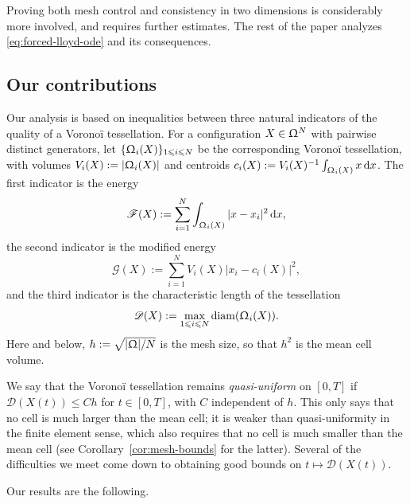 \documentclass[letterpaper,11pt,twoside]{article}
\numberwithin{figure}{section}
\numberwithin{table}{section}
\theoremstyle{cpamplain}
\theoremstyle{cpamdefinition}
\newcommand{\diff}{\mathrm{d}}
\let\Omega\Upomega
\renewcommand{\leq}{\leqslant}
\renewcommand{\le}{\leqslant}
\numberwithin{equation}{section}
\begin{document}
Proving both mesh control and consistency in two dimensions is considerably more involved, and requires further estimates.
The rest of the paper analyzes \eqref{eq:forced-lloyd-ode} and its consequences.

\subsection{Our contributions}\label{sec:contributions}

Our analysis is based on inequalities between three natural indicators of the quality of a Vorono\"i tessellation.
For a configuration $X\in\Omega^N$ with pairwise distinct generators, let $\{\Omega_i(X)\}_{1\le i\le N}$ be the corresponding Vorono\"i tessellation, with
volumes $V_i(X):=|\Omega_i(X)|$ and centroids $c_i(X):=V_i(X)^{-1}\int_{\Omega_i(X)}x\,\diff x$.
The first indicator is the energy
\begin{equation}\label{eq:energy-F}
\mathscr F(X):=\sum_{i=1}^N\int_{\Omega_i(X)}|x-x_i|^2\,\diff x,
\end{equation}
the second indicator is the modified energy
\begin{equation}\label{eq:energy-G}
\mathscr G(X):=\sum_{i=1}^N V_i(X)|x_i-c_i(X)|^2,
\end{equation}
and the third indicator is the characteristic length of the tessellation
\begin{equation}\label{eq:energy-D}
\mathscr D(X):=  \max_{1\leq i \leq N} \operatorname{diam}(\Omega_i(X)).
\end{equation}
Here and below, $h:=\sqrt{|\Omega|/N}$ is the mesh size, so that $h^2$ is the mean cell volume.

We say that the Vorono\"i tessellation remains \emph{quasi-uniform} on $[0,T]$ if $\mathscr D(X(t))\le Ch$ for $t\in[0,T]$, with $C$ independent of $h$.
This only says that no cell is much larger than the mean cell; it is weaker than quasi-uniformity in the finite element sense, which also requires that no cell is much smaller than the mean cell (see Corollary~\ref{cor:mesh-bounds} for the latter).
Several of the difficulties we meet come down to obtaining good bounds on $t\mapsto \mathscr D(X(t))$.

Our results are the following.
\end{document}
